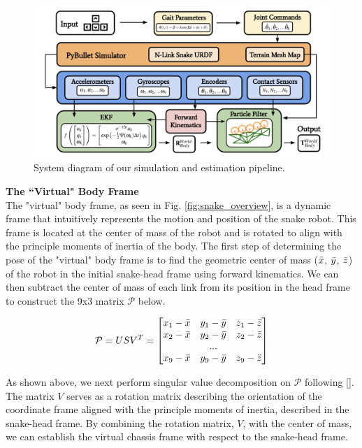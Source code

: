 \documentclass[letterpaper, 10 pt, conference]{ieeeconf}  %
\begin{document}
\begin{figure}
\centering
\includegraphics[scale=0.3]{diagram.png}
\caption{System diagram of our simulation and estimation pipeline. }
\label{extended_model_arch}
\end{figure}


\noindent \textbf{The ``Virtual" Body Frame} \\
The "virtual" body frame, as seen in Fig. \ref{fig:snake_overview}, is a dynamic frame that intuitively represents the motion and position of the snake robot. This frame is located at the center of mass of the robot and is rotated to align with the principle moments of inertia of the body. The first step of determining the pose of the "virtual" body frame is to find the geometric center of mass ($\Bar{x}$, $\Bar{y}$, $\Bar{z}$) of the robot in the initial snake-head frame using forward kinematics. We can then subtract the center of mass of each link from its position in the head frame to construct the 9x3 matrix $\mathcal{P}$ below. 


\begin{equation}
    \mathcal{P} = USV^T = \begin{bmatrix}
        x_1 - \Bar{x} & y_1 - \Bar{y} & z_1 - \Bar{z} \\
        x_2 - \Bar{x} & y_2 - \Bar{y} & z_2 - \Bar{z} \\
        & ... &  \\
        x_9 - \Bar{x} & y_9 - \Bar{y} & z_9 - \Bar{z} \\
    \end{bmatrix}
\end{equation}

As shown above, we next perform singular value decomposition on $\mathcal{P}$ following [\cite{virtual_chas}]. The matrix $V$ serves as a rotation matrix describing the orientation of the coordinate frame aligned with the principle moments of inertia, described in the snake-head frame. By combining the rotation matrix, $V$, with the center of mass, we can establish the virtual chassis frame with respect to the snake-head frame. 
\end{document}
